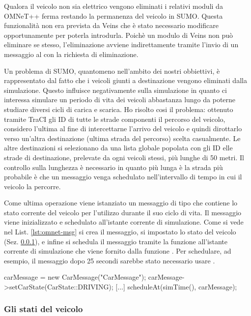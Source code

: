 Qualora il veicolo non sia elettrico vengono eliminati i relativi moduli da OMNeT++ ferma restando la permanenza del veicolo in SUMO. Questa funzionalità non era prevista da Veins che è stato necessario modificare opportunamente per poterla introdurla. Poichè un modulo di Veins non può eliminare se stesso, l'eliminazione avviene indirettamente tramite l'invio di un messaggio al  con la richiesta di eliminazione.

Un problema di SUMO, quantomeno nell'ambito dei nostri obbiettivi, è rappresentato dal fatto che i veicoli giunti a destinazione vengono eliminati dalla simulazione. Questo influisce negativamente sulla simulazione in quanto ci interessa simulare un periodo di vita dei veicoli abbastanza lungo da poterne studiare diversi cicli di carica e scarica. Ho risolto cosi il problema: ottenuto tramite TraCI gli ID di tutte le strade componenti il percorso del veicolo, considero l'ultima al fine di intercettarne l'arrivo del veicolo e quindi dirottarlo verso un'altra destinazione (ultima strada del percorso) scelta casualmente. Le altre destinazioni si selezionano da una lista globale popolata con gli ID elle strade di destinazione, prelevate da ogni veicoli stessi, più lunghe di 50 metri. Il controllo sulla lunghezza è necessario in quanto più lunga è la strada più probabile è che un messaggio venga schedulato nell'intervallo di tempo in cui il veicolo la percorre.

Come ultima operazione viene istanziato un messaggio di tipo  che contiene lo stato corrente del veicolo per l'utilizzo durante il suo ciclo di vita. Il messaggio viene inizializzato e schedulato all'istante corrente di simulazione. Come si vede nel List. \ref{lst:omnet-msg} si crea il messaggio, si impostato lo stato del veicolo (Sez. \ref{subsubsec:veh-state}), e infine si schedula il messaggio tramite la funzione  all'istante corrente di simulazione che viene fornito dalla funzione . Per schedulare, ad esempio, il messaggio dopo 25 secondi sarebbe stato necessario usare .

\begin{cpp}[caption={Autoschedulazione Messaggio},label={lst:omnet-msg}]
carMessage = new CarMessage("CarMessage");
carMessage->setCarState(CarState::DRIVING);
[...]
scheduleAt(simTime(), carMessage);
\end{cpp}


\subsubsection{Gli stati del veicolo}\label{subsubsec:veh-state}

